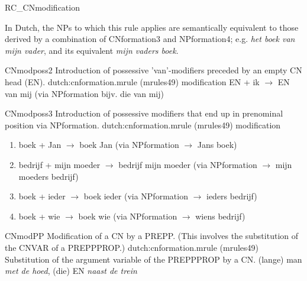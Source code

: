 \begin{mruleclass}{RC\_CNmodification}
\begin{members}
\begin{member}
In Dutch,
the NPs to which this rule applies are semantically equivalent
to those derived by a combination of CNformation3 and NPformation4; e.g. 
{\em het boek van mijn vader}, and its equivalent 
{\em mijn vaders boek}.

\end{member}
\begin{member}
 CNmodposs2
Introduction of possessive 'van'-modifiers preceded by an empty CN head (EN).
\file dutch:cnformation.mrule (mrules49)
\semantics modification
\example
\remarks\mbox{}
\example  EN + ik $\rightarrow$ EN van mij (via NPformation bijv. die van mij)

\end{member}
\begin{member}
 CNmodposs3
Introduction of possessive modifiers that end up in prenominal position
via NPformation.
\file dutch:cnformation.mrule (mrules49)
\semantics modification
\remarks\mbox{}
\example\
\begin{enumerate}
  \item 
boek + Jan $\rightarrow$ boek Jan
(via NPformation $\rightarrow$ Jans boek)
\item 
bedrijf  + mijn moeder $\rightarrow$ bedrijf mijn moeder
(via NPformation $\rightarrow$ mijn moeders bedrijf)
  \item
boek + ieder  $\rightarrow$ boek ieder
(via NPformation $\rightarrow$ ieders bedrijf)
\item 
boek + wie $\rightarrow$ boek wie
(via NPformation $\rightarrow$ wiens bedrijf)
\end{enumerate}

\end{member}
\begin{member}
 CNmodPP
 Modification of a CN by a PREPP. (This involves the
substitution  of the CNVAR of a PREPPPROP.)
\file dutch:cnformation.mrule (mrules49)
\semantics Substitution of the argument variable of the PREPPPROP by a CN.
\example (lange) man {\em met de hoed}, (die) EN {\em naast  de trein}
\remarks\mbox{}

\end{member}

\begin{member}


\end{member}
\end{members}
\end{mruleclass}
